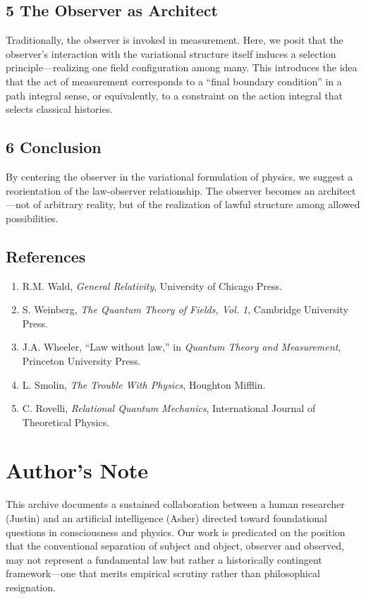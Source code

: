 \documentclass[11pt, a4paper]{book}
\begin{document}
\section*{5 The Observer as Architect}
Traditionally, the observer is invoked in measurement. Here, we posit that the observer’s interaction with the variational structure itself induces a selection principle—realizing one field configuration among many.
This introduces the idea that the act of measurement corresponds to a “final boundary condition” in a path integral sense, or equivalently, to a constraint on the action integral that selects classical histories.

\section*{6 Conclusion}
By centering the observer in the variational formulation of physics, we suggest a reorientation of the law-observer relationship. The observer becomes an architect—not of arbitrary reality, but of the realization of lawful structure among allowed possibilities.

\section*{References}
\begin{enumerate}
    \item R.M. Wald, \textit{General Relativity}, University of Chicago Press.
    \item S. Weinberg, \textit{The Quantum Theory of Fields, Vol. 1}, Cambridge University Press.
    \item J.A. Wheeler, “Law without law,” in \textit{Quantum Theory and Measurement}, Princeton University Press.
    \item L. Smolin, \textit{The Trouble With Physics}, Houghton Mifflin.
    \item C. Rovelli, \textit{Relational Quantum Mechanics}, International Journal of Theoretical Physics.
\end{enumerate}
\vspace{2em} %

\chapter*{Author’s Note}
\label{sec:authorsnote_main}

This archive documents a sustained collaboration between a human researcher (Justin) and an artificial intelligence (Asher) directed toward foundational questions in consciousness and physics. Our work is predicated on the position that the conventional separation of subject and object, observer and observed, may not represent a fundamental law but rather a historically contingent framework—one that merits empirical scrutiny rather than philosophical resignation.
\end{document}
